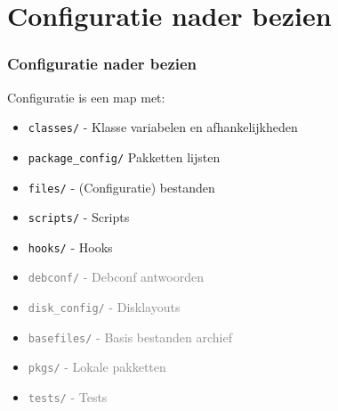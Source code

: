 \documentclass{beamer}
\newcommand{\light}[1]{\textcolor{gray}{#1}}
\begin{document}
\section{Configuratie nader bezien}
\begin{frame}
\frametitle{Configuratie nader bezien}
Configuratie is een map met:
\begin{itemize}
  \item \texttt{classes/} - Klasse variabelen en afhankelijkheden
  \item<2-> \texttt{package\_config/}  Pakketten lijsten
  \item<3-> \texttt{files/} - (Configuratie) bestanden
  \item<4-> \texttt{scripts/} - Scripts
  \item<5-> \texttt{hooks/} - Hooks
  \item<6-> \light{\texttt{debconf/} - Debconf antwoorden}
  \item<6-> \light{\texttt{disk\_config/} - Disklayouts}
  \item<6-> \light{\texttt{basefiles/} - Basis bestanden archief}
  \item<6-> \light{\texttt{pkgs/} - Lokale pakketten}
  \item<6-> \light{\texttt{tests/} - Tests}
\end{itemize}
\end{frame}
\end{document}
